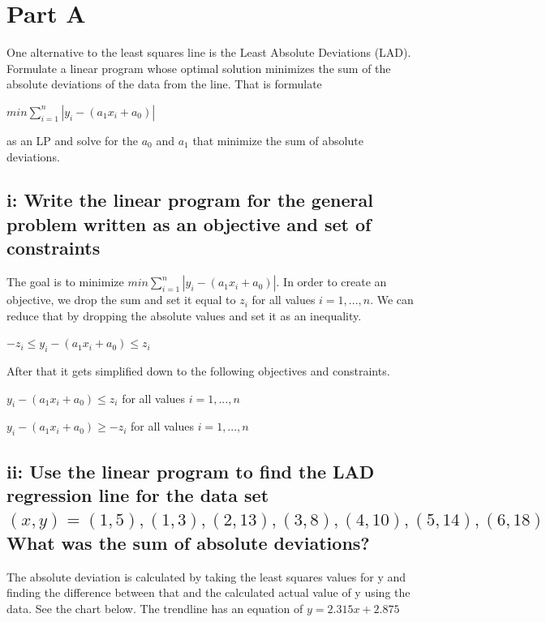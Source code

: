 \clearpage
\section{Part A}
One alternative to the least squares line is the Least Absolute Deviations (LAD). Formulate a linear program whose optimal solution minimizes the sum of the absolute deviations of the data from the line. That is formulate 
\begin{center} $ min  \sum_{i=1}^{n} |y_{i} - (a_{1}x_{i} + a_{0})|$ \end{center} 
as an LP and solve for the $a_0$ and $a_1$ that minimize the sum of absolute deviations.

\subsection{i: Write the linear program for the general problem written as an objective and set of constraints}
The goal is to minimize $ min  \sum_{i=1}^{n} |y_{i} - (a_{1}x_{i} + a_{0})|$. In order to create an objective, we drop the sum and set it equal to $z_i$ for all values $i = 1,...,n$. We can reduce that by dropping the absolute values and set it as an inequality.
\begin{center} $-z_{i} \leq y_{i} - (a_{1}x_{i} + a_{0}) \leq z_{i}$  \end{center}
After that it gets simplified down to the following objectives and constraints. 

\begin{center} $ y_{i} - (a_{1}x_{i} + a_{0}) \leq z_{i}$  for all values $i = 1,...,n$\end{center}
\begin{center} $ y_{i} - (a_{1}x_{i} + a_{0}) \geq -z_{i}$  for all values $i = 1,...,n$\end{center}

\subsection{ii: Use the linear program to find the LAD regression line for the data set $(x,y) = { (1,5), (1, 3), (2, 13), ( 3, 8), (4,10), ( 5, 14), (6, 18) }$
What was the sum of absolute deviations?}

The absolute deviation is calculated by taking the least squares values for y and finding the difference between that and the calculated actual value of y using the data. See the chart below. The trendline has an equation of $y = 2.315x + 2.875$

